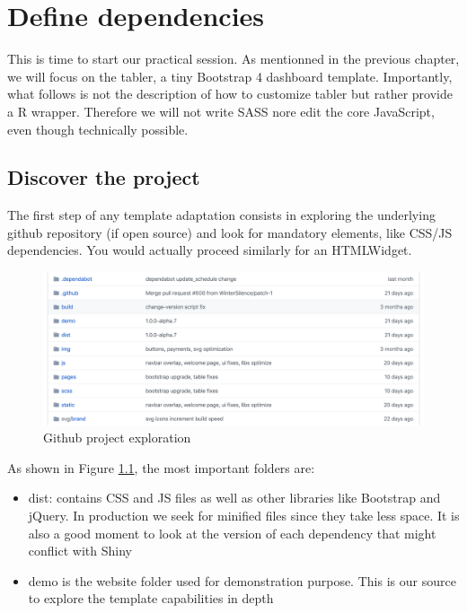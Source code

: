\documentclass[]{book}
\providecommand{\tightlist}{%
  \setlength{\itemsep}{0pt}\setlength{\parskip}{0pt}}
\begin{document}
\hypertarget{custom-templates-dependencies}{%
\chapter{Define dependencies}\label{custom-templates-dependencies}}

This is time to start our practical session. As mentionned in the previous chapter, we will focus on the tabler, a tiny Bootstrap 4 dashboard template.
Importantly, what follows is not the description of how to customize tabler but rather provide a R wrapper. Therefore we will not write SASS nore edit the core JavaScript, even though technically possible.

\hypertarget{discover-the-project}{%
\section{Discover the project}\label{discover-the-project}}

The first step of any template adaptation consists in exploring the underlying github repository (if open source) and look for mandatory elements, like CSS/JS dependencies. You would actually proceed similarly for an HTMLWidget.

\begin{figure}
\includegraphics[width=32.03in]{images/practice/tabler-github} \caption{Github project exploration}\label{fig:tabler-github}
\end{figure}

As shown in Figure \ref{fig:tabler-github}, the most important folders are:

\begin{itemize}
\tightlist
\item
  dist: contains CSS and JS files as well as other libraries like Bootstrap and jQuery. In production we seek for minified files since they take less space. It is also a good moment to look at the version of each dependency that might conflict with Shiny
\item
  demo is the website folder used for demonstration purpose. This is our source to explore the template capabilities in depth
\end{itemize}
\end{document}
